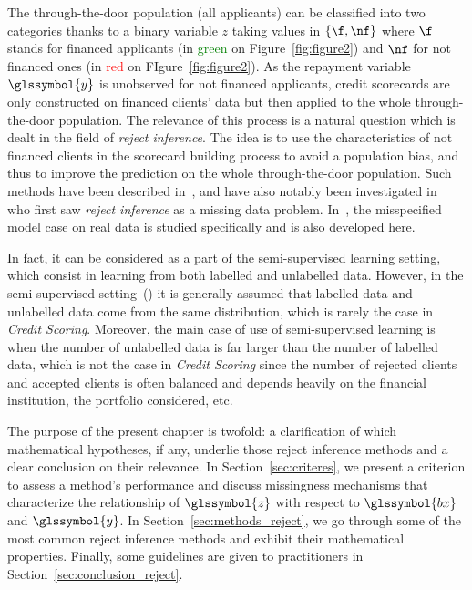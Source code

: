 The through-the-door population (all applicants) can be classified into two categories thanks to a binary variable $z$ taking values in $\{\f,\nf\}$ where $\f$ stands for financed applicants (in \textcolor{green}{green} on Figure~\ref{fig:figure2}) and $\nf$ for not financed ones (in \textcolor{red}{red} on FIgure~\ref{fig:figure2}). As the repayment variable $\glssymbol{y}$ is unobserved for not financed applicants, credit scorecards are only constructed on financed clients' data but then applied to the whole  through-the-door population. The relevance of this process is a natural question which is dealt in the field of \textit{reject inference}. The idea is to use the characteristics of not financed clients in the scorecard building process to avoid a population bias, and thus to improve the prediction on the whole through-the-door population. Such methods have been described in~\cite{RI6,saporta,banasik,economix}, and have also notably been investigated in~\cite{RI2} who first saw \textit{reject inference} as a missing data problem. In~\cite{RI3}, the misspecified model case on real data is studied specifically and is also developed here.


In fact, it can be considered as a part of the semi-supervised learning setting, which consist in learning from both labelled and unlabelled data. However, in the semi-supervised setting~(\cite{ChaSchZie06}) it is generally assumed that labelled data and unlabelled data come from the same distribution, which is rarely the case in \textit{Credit Scoring}. Moreover, the main case of use of semi-supervised learning is when the number of unlabelled data is far larger than the number of labelled data, which is not the case in \textit{Credit Scoring} since the number of rejected clients and accepted clients is often balanced and depends heavily on the financial institution, the portfolio considered, etc.


The purpose of the present chapter is twofold: a clarification of which mathematical hypotheses, if any, underlie those reject inference methods and a clear conclusion on their relevance. In Section~\ref{sec:criteres}, we present a criterion to assess a method's performance and discuss missingness mechanisms that characterize the relationship of $\glssymbol{z}$ with respect to $\glssymbol{bx}$ and $\glssymbol{y}$. In Section~\ref{sec:methods_reject}, we go through some of the most common reject inference methods and exhibit their mathematical properties. 
Finally, some guidelines are given to practitioners in Section~\ref{sec:conclusion_reject}.

